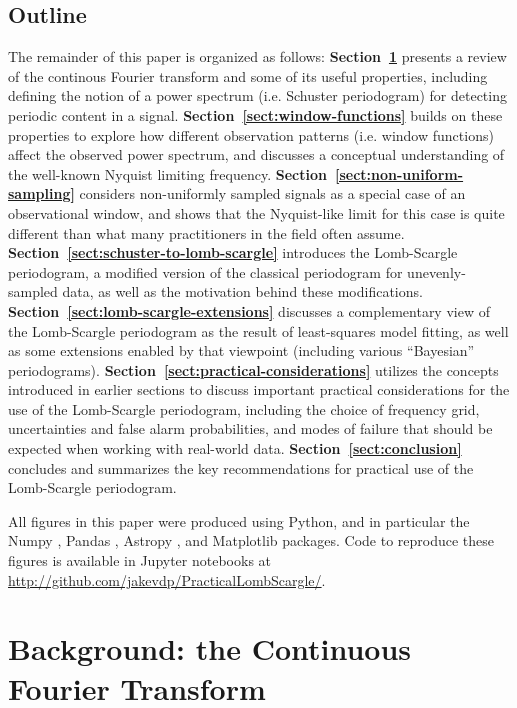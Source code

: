 \documentclass[preprint]{aastex}
\newcommand{\Sect}[1]{Section~\ref{sect:#1}}
\newcommand{\sect}[1]{\Sect{#1}}
\newcommand{\sectlabel}[1]{\label{sect:#1}}
\begin{document}
\subsection{Outline}
The remainder of this paper is organized as follows:
{\bf\sect{continuous-fourier-transform}} presents a review of the 
continous Fourier transform and some of its useful properties,
including defining the notion of a power spectrum (i.e. Schuster
periodogram) for detecting periodic content in a signal.
{\bf\sect{window-functions}} builds on these properties to explore how
different observation patterns (i.e. window functions) affect the observed
power spectrum, and discusses a conceptual understanding of the
well-known Nyquist limiting frequency.
{\bf\sect{non-uniform-sampling}} considers non-uniformly sampled signals as
a special case of an observational window, and shows that the Nyquist-like
limit for this case is quite different than what many practitioners in 
the field often assume.
{\bf\sect{schuster-to-lomb-scargle}} introduces the Lomb-Scargle periodogram,
a modified version of the classical periodogram for unevenly-sampled data,
as well as the motivation behind these modifications.
{\bf\sect{lomb-scargle-extensions}} discusses a complementary view of the
Lomb-Scargle periodogram as the result of least-squares model fitting,
as well as some extensions enabled by that viewpoint
(including various ``Bayesian'' periodograms).
{\bf\sect{practical-considerations}} utilizes the concepts introduced
in earlier sections to discuss important practical considerations for
the use of the Lomb-Scargle periodogram, including the choice of
frequency grid, uncertainties and false alarm probabilities, and modes of
failure that should be expected when working with real-world data.
{\bf\sect{conclusion}} concludes and summarizes the key recommendations
for practical use of the Lomb-Scargle periodogram.

All figures in this paper were produced using Python, and in particular the
Numpy \citep{numpy, numpybook},
Pandas \citep{pandas},
Astropy \citep{Astropy2013},
and Matplotlib \citep{matplotlib} packages.
Code to reproduce these figures is available in Jupyter notebooks at
\url{http://github.com/jakevdp/PracticalLombScargle/}.

\section{Background: the Continuous Fourier Transform}
\sectlabel{continuous-fourier-transform}
\end{document}
